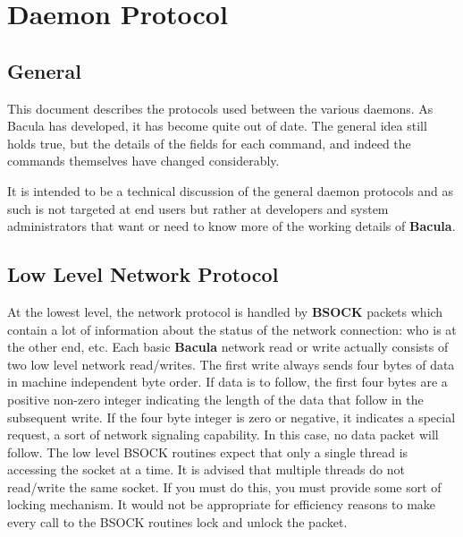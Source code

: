 
\chapter{Daemon Protocol}
\label{_ChapterStart2}

\section{General}

This document describes the protocols used between the various daemons. As
Bacula has developed, it has become quite out of date. The general idea still
holds true, but the details of the fields for each command, and indeed the
commands themselves have changed considerably.

It is intended to be a technical discussion of the general daemon protocols
and as such is not targeted at end users but rather at developers and system
administrators that want or need to know more of the working details of {\bf
Bacula}.

\section{Low Level Network Protocol}

At the lowest level, the network protocol is handled by {\bf BSOCK} packets
which contain a lot of information about the status of the network connection:
who is at the other end, etc. Each basic {\bf Bacula} network read or write
actually consists of two low level network read/writes. The first write always
sends four bytes of data in machine independent byte order. If data is to
follow, the first four bytes are a positive non-zero integer indicating the
length of the data that follow in the subsequent write. If the four byte
integer is zero or negative, it indicates a special request, a sort of network
signaling capability. In this case, no data packet will follow. The low level
BSOCK routines expect that only a single thread is accessing the socket at a
time. It is advised that multiple threads do not read/write the same socket.
If you must do this, you must provide some sort of locking mechanism. It would
not be appropriate for efficiency reasons to make every call to the BSOCK
routines lock and unlock the packet.

